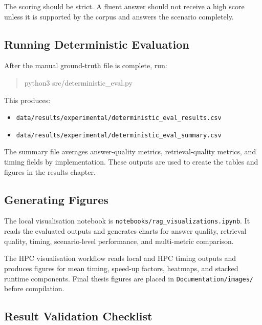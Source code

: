 The scoring should be strict. A fluent answer should not receive a high score unless it is supported by the corpus and answers the scenario completely.

\subsection*{Running Deterministic Evaluation}

After the manual ground-truth file is complete, run:

\begin{quote}
\small\ttfamily
python3 src/deterministic\_eval.py
\end{quote}

This produces:

\begin{itemize}
    \item \texttt{data/results/experimental/deterministic\_eval\_results.csv}
    \item \texttt{data/results/experimental/deterministic\_eval\_summary.csv}
\end{itemize}

The summary file averages answer-quality metrics, retrieval-quality metrics, and timing fields by implementation. These outputs are used to create the tables and figures in the results chapter.

\subsection*{Generating Figures}

The local visualisation notebook is \texttt{notebooks/rag\_visualizations.ipynb}. It reads the evaluated outputs and generates charts for answer quality, retrieval quality, timing, scenario-level performance, and multi-metric comparison.

The \ac{HPC} visualisation workflow reads local and \ac{HPC} timing outputs and produces figures for mean timing, speed-up factors, heatmaps, and stacked runtime components. Final thesis figures are placed in \texttt{Documentation/images/} before compilation.

\subsection*{Result Validation Checklist}

